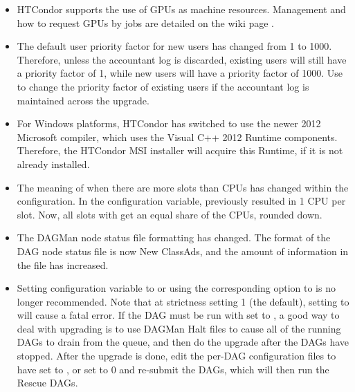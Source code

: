 \begin{itemize}
\item HTCondor supports the use of GPUs as machine resources.
Management and how to request GPUs by jobs are detailed on
the wiki page
.

\item The default user priority factor for new users has changed 
from 1 to 1000.
Therefore, unless the accountant log is discarded,
existing users will still have a priority factor of 1,
while new users will have a priority factor of 1000.
Use  to change the priority factor of existing users
if the accountant log is maintained across the upgrade. 

\item For Windows platforms,
HTCondor has switched to use the newer 2012 Microsoft compiler,
which uses the Visual C++ 2012 Runtime components.
Therefore, the HTCondor MSI installer will acquire this Runtime,
if it is not already installed.

\item The meaning of  when there are more 
slots than CPUs has changed within the configuration. 
In the  configuration variable,
 previously resulted in 1 CPU per slot. 
Now, all slots with  get an equal share of the CPUs, 
rounded down.

\item The DAGMan node status file formatting has changed.
The format of the DAG node status file is now New ClassAds,
and the amount of information in the file has increased.

\item Setting configuration variable
 to 
or using the corresponding  option
to  is no longer recommended.
Note that at strictness setting 1 (the default), setting
 to 
will cause a fatal error. 
If the DAG must be run with  
set to ,
a good way to deal with upgrading is to use DAGMan Halt files 
to cause all of the running DAGs to drain from the queue, 
and then do the upgrade after the DAGs have stopped.  
After the upgrade is done, 
edit the per-DAG configuration files to have 
 set to ,
or set  to 0 and 
re-submit the DAGs, which will then run the Rescue DAGs.


\end{itemize}
